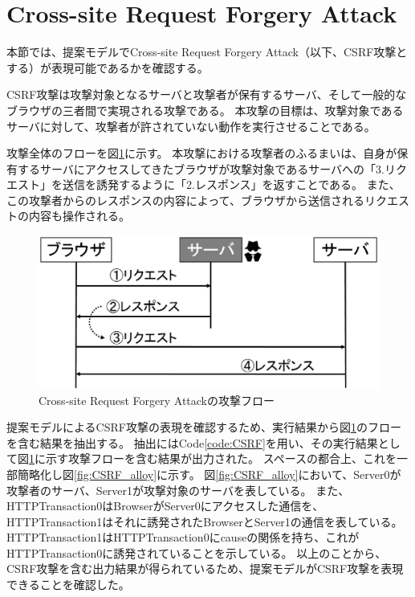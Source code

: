 \documentclass[12pt,a4paper]{jbook}
\begin{document}
\section{Cross-site Request Forgery Attack}
本節では、提案モデルでCross-site Request Forgery Attack\cite{cookie-model}（以下、CSRF攻撃とする）が表現可能であるかを確認する。

CSRF攻撃は攻撃対象となるサーバと攻撃者が保有するサーバ、そして一般的なブラウザの三者間で実現される攻撃である。
本攻撃の目標は、攻撃対象であるサーバに対して、攻撃者が許されていない動作を実行させることである。

攻撃全体のフローを図\ref{fig:CSRF_flow}に示す。
本攻撃における攻撃者のふるまいは、自身が保有するサーバにアクセスしてきたブラウザが攻撃対象であるサーバへの「3.リクエスト」を送信を誘発するように「2.レスポンス」を返すことである。
また、この攻撃者からのレスポンスの内容によって、ブラウザから送信されるリクエストの内容も操作される。

\begin{figure}[htb]
\centering
\includegraphics[width=400pt]{./fig/CSRF_flow.eps}
\caption{Cross-site Request Forgery Attackの攻撃フロー}
\label{fig:CSRF_flow}
\end{figure}

提案モデルによるCSRF攻撃の表現を確認するため、実行結果から図\ref{fig:CSRF_flow}のフローを含む結果を抽出する。
抽出にはCode\ref{code:CSRF}を用い、その実行結果として図\ref{fig:CSRF_flow}に示す攻撃フローを含む結果が出力された。
スペースの都合上、これを一部簡略化し図\ref{fig:CSRF_alloy}に示す。
図\ref{fig:CSRF_alloy}において、Server0が攻撃者のサーバ、Server1が攻撃対象のサーバを表している。
また、HTTPTransaction0はBrowserがServer0にアクセスした通信を、HTTPTransaction1はそれに誘発されたBrowserとServer1の通信を表している。
HTTPTransaction1はHTTPTransaction0にcauseの関係を持ち、これがHTTPTransaction0に誘発されていることを示している。
以上のことから、CSRF攻撃を含む出力結果が得られているため、提案モデルがCSRF攻撃を表現できることを確認した。
\end{document}
